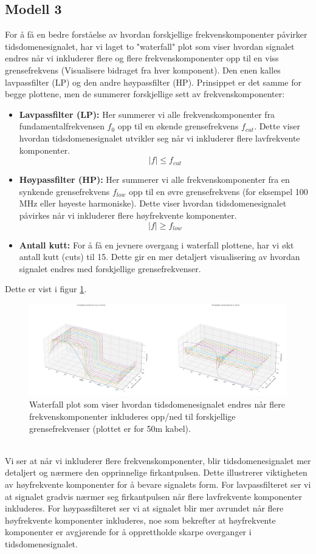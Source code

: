 \subsection{Modell 3}
For å få en bedre forståelse av hvordan forskjellige frekvenskomponenter påvirker tidsdomenesignalet, har vi laget to "waterfall" plot som viser hvordan signalet endres når vi inkluderer flere og flere frekvenskomponenter opp til en viss grensefrekvens (Visualisere bidraget fra hver komponent). Den enen kalles lavpassfilter (LP) og den andre høypassfilter (HP). Prinsippet er det samme for begge plottene, men de summerer forskjellige sett av frekvenskomponenter:
\begin{itemize}
    \item \textbf{Lavpassfilter (LP):} Her summerer vi alle frekvenskomponenter fra fundamentalfrekvensen $f_0$ opp til en økende grensefrekvens $f_{cut}$. Dette viser hvordan tidsdomenesignalet utvikler seg når vi inkluderer flere lavfrekvente komponenter.
    \[
        |f| \leq f_{cut}
    \]
    \item \textbf{Høypassfilter (HP):} Her summerer vi alle frekvenskomponenter fra en synkende grensefrekvens $f_{low}$ opp til en øvre grensefrekvens (for eksempel 100 MHz eller høyeste harmoniske). Dette viser hvordan tidsdomenesignalet påvirkes når vi inkluderer flere høyfrekvente komponenter.
    \[
        |f| \geq f_{low}
    \]
    \item \textbf{Antall kutt:} For å få en jevnere overgang i waterfall plottene, har vi økt antall kutt (cuts) til 15. Dette gir en mer detaljert visualisering av hvordan signalet endres med forskjellige grensefrekvenser.
\end{itemize}
Dette er vist i figur \ref{fig:modell3}.
\begin{figure}[h]
    \centering
    \includegraphics[width=1\textwidth]{Media/modellering3.png}
    \caption{Waterfall plot som viser hvordan tidsdomenesignalet endres når flere frekvenskomponenter inkluderes opp/ned til forskjellige grensefrekvenser (plottet er for 50m kabel).}
    \label{fig:modell3}
\end{figure}\\
Vi ser at når vi inkluderer flere frekvenskomponenter, blir tidsdomenesignalet mer detaljert og nærmere den opprinnelige firkantpulsen. Dette illustrerer viktigheten av høyfrekvente komponenter for å bevare signalets form. For lavpassfilteret ser vi at signalet gradvis nærmer seg firkantpulsen når flere lavfrekvente komponenter inkluderes. For høypassfilteret ser vi at signalet blir mer avrundet når flere høyfrekvente komponenter inkluderes, noe som bekrefter at høyfrekvente komponenter er avgjørende for å opprettholde skarpe overganger i tidsdomenesignalet.